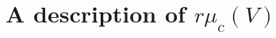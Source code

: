 \documentclass[dvipdfmx]{jsarticle}
\begin{document}
\newpage
\section{A description of \(r\mu_c(V)\)}

\end{document}
